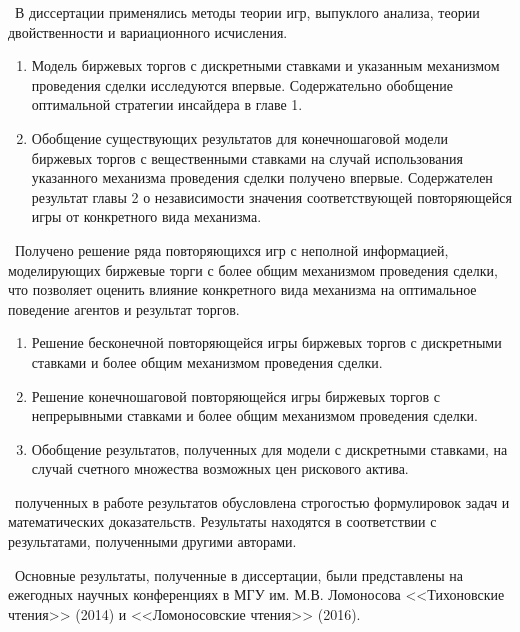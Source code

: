\methods\ В диссертации применялись методы теории игр, выпуклого анализа, теории
двойственности и вариационного исчисления.

\novelty
\begin{enumerate}
\item Модель биржевых торгов с дискретными ставками и указанным механизмом
  проведения сделки исследуются впервые. Содержательно обобщение оптимальной
  стратегии инсайдера в главе 1.
\item Обобщение существующих результатов для конечношаговой модели биржевых
  торгов с вещественными ставками на случай использования указанного механизма
  проведения сделки получено впервые. Содержателен результат главы 2 о
  независимости значения соответствующей повторяющейся игры от конкретного вида
  механизма.
\end{enumerate}

\influence\ Получено решение ряда повторяющихся игр с неполной информацией,
моделирующих биржевые торги с более общим механизмом проведения сделки, что
позволяет оценить влияние конкретного вида механизма на оптимальное поведение
агентов и результат торгов.

\begin{enumerate}
  \item Решение бесконечной повторяющейся игры биржевых торгов с дискретными ставками и
    более общим механизмом проведения сделки.
  \item Решение конечношаговой повторяющейся игры биржевых торгов с непрерывными
    ставками и более общим механизмом проведения сделки.
  \item Обобщение результатов, полученных для модели с дискретными ставками, на
    случай счетного множества возможных цен рискового актива. 
\end{enumerate}

\reliability\ полученных в работе результатов обусловлена строгостью
формулировок задач и математических доказательств. Результаты находятся в
соответствии с результатами, полученными другими авторами.


\probation\ Основные результаты, полученные в диссертации, были представлены на
ежегодных научных конференциях в МГУ им. М.В. Ломоносова <<Тихоновские чтения>>
(2014) и <<Ломоносовские чтения>> (2016).



